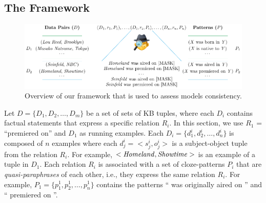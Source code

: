 \subsection{The Framework}
\label{sec:framework}

\begin{figure}[t!]
\centering

\includegraphics[width=1.\columnwidth]{figures/framework}

\caption{Overview of our framework that is used to assess models consistency.}
\label{fig:framework}
\end{figure}

Let
$D = \{D_1, D_2,
\dots, D_m\}$
be a set of sets of KB tuples,
where each $D_i$ contains factual statements
that express a specific relation $R_i$. In this section, we
use $R_1$ = ``premiered
on'' and $D_1$
as running examples. Each $D_i=\{d_1^i,
d_2^i, \dots, d_n^i\}$
is composed of $n$ examples  where each $d_j^i = <s_j^i,o_j^i>$
is a subject-object tuple from the relation $R_i$. 
For example,
$<\text{\textit{Homeland}},
\text{\textit{Showtime}}>$
is an example of a 
tuple in $D_1$.
Each relation $R_i$ is associated with a set of
cloze-patterns $P_i$ that are \textit{quasi-paraphrases} of
each other, i.e., they express the same relation $R_i$. For example, $P_1=\{p_1^1, p_2^1, \dots, p_n^1\}$ contains the patterns ``\subj{} was originally aired on \obj{}'' and ``\subj{} premiered on \obj{}''.

